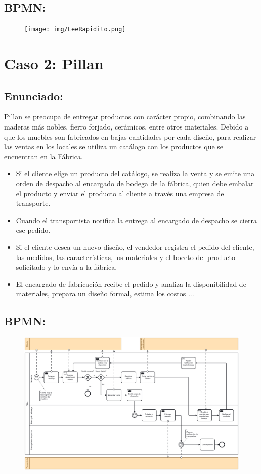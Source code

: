 \documentclass{templateApunte}
\begin{document}
\newpage
\begin{landscape}
  \subsection{BPMN: }
  \begin{figure}[H]
    \centering
    \texttt{[image: img/LeeRapidito.png]}
  \end{figure}
\end{landscape}

\section{Caso 2: Pillan}
\subsection{Enunciado:}
Pillan se preocupa de entregar productos con carácter propio, combinando las maderas más nobles, fierro forjado, cerámicos, entre otros materiales. Debido a que los muebles son fabricados en bajas cantidades por cada diseño, para realizar las ventas en los locales se utiliza un catálogo con los productos que se encuentran en la Fábrica.
\begin{itemize}
  \item Si el cliente elige un producto del catálogo, se realiza la venta y se emite una orden de despacho al encargado de bodega de la fábrica, quien debe embalar el producto y enviar el producto al cliente a través una empresa de transporte.
  \item Cuando el transportista notifica la entrega al encargado de despacho se cierra ese pedido.
  \item Si el cliente desea un nuevo diseño, el vendedor registra el pedido del cliente, las medidas, las características, los materiales y el boceto del producto solicitado y lo envía a la fábrica.
  \item El encargado de fabricación recibe el pedido y analiza la disponibilidad de materiales, prepara un diseño formal, estima los costos ...
\end{itemize}

\subsection{BPMN:}
\begin{figure}[H]
  \centering
  \includegraphics[width=\textwidth]{img/Pillan.png}
\end{figure}
\end{document}
